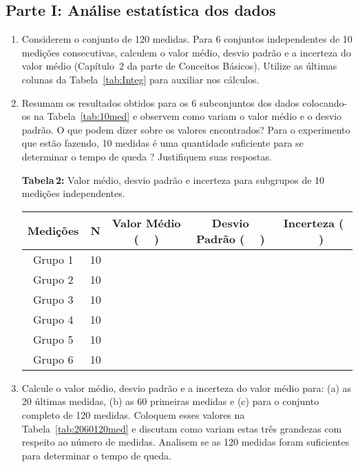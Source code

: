 \subsection*{Parte I: Análise estatística dos dados}
\vspace{-0.4cm}

\begin{enumerate}
\item Considerem o conjunto de 120 medidas. Para 6 conjuntos independentes de 10 medições consecutivas, calculem o valor médio, desvio padrão e a incerteza do valor médio (Capítulo~2 da parte  de Conceitos Básicos). Utilize as últimas colunas da Tabela~\ref{tab:Integ} para auxiliar nos cálculos.

\item Resumam os resultados obtidos para os 6 subconjuntos dos dados colocando-os na Tabela~\ref{tab:10med} e observem como variam o valor médio e o desvio padrão. O que podem dizer sobre os valores encontrados? Para o experimento que estão fazendo, 10 medidas é uma quantidade suficiente para se determinar o tempo de queda ? Justifiquem suas respostas. 

\renewcommand{\arraystretch}{1.5}

\begin{center}
{{\bf Tabela\,2:} Valor médio, desvio padrão e incerteza para subgrupos de 10 medições independentes.} 
  \begin{tabular}{|c|c|c|c|c|} \hline
  \bf Medições & \bf N & \bf Valor Médio ($\;\;\;\;\;$) & \bf Desvio Padrão ($\;\;\;\;\;$) & \bf Incerteza ($\;\;\;\;\;$) \\ \hline
  Grupo 1 & 10 & & & \\ \hline
  Grupo 2 & 10 & & & \\ \hline
  Grupo 3 & 10 & & & \\ \hline
  Grupo 4 & 10 & & & \\ \hline
  Grupo 5 & 10 & & & \\ \hline
  Grupo 6 & 10 & & & \\ \hline
  \end{tabular}
  \label{tab:10med}
\end{center}

\item Calcule o valor médio, desvio padrão e a incerteza do valor médio para: (a) as 20 últimas medidas, (b) as 60 primeiras medidas e (c) para o conjunto completo de 120 medidas. Coloquem esses valores na Tabela~\ref{tab:2060120med} e discutam como  variam estas três grandezas com respeito ao número de medidas. Analisem se as 120 medidas foram suficientes para determinar o tempo de queda. 



\end{enumerate}
